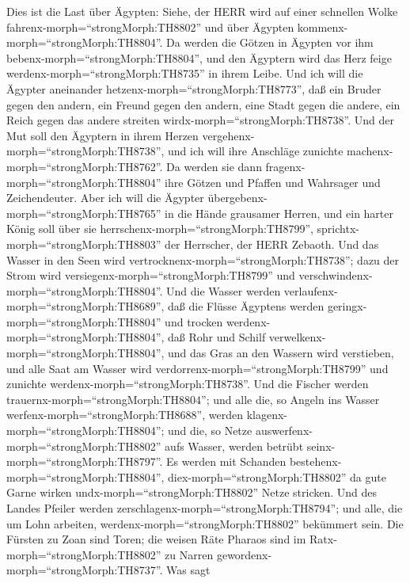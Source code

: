  Dies ist die Last über Ägypten: Siehe, der HERR wird auf
einer schnellen Wolke fahrenx-morph=``strongMorph:TH8802'' und über
Ägypten kommenx-morph=``strongMorph:TH8804''. Da werden die Götzen in
Ägypten vor ihm bebenx-morph=``strongMorph:TH8804'', und den Ägyptern
wird das Herz feige werdenx-morph=``strongMorph:TH8735'' in ihrem Leibe.
 Und ich will die Ägypter aneinander
hetzenx-morph=``strongMorph:TH8773'', daß ein Bruder gegen den andern,
ein Freund gegen den andern, eine Stadt gegen die andere, ein Reich
gegen das andere streiten wirdx-morph=``strongMorph:TH8738''.
 Und der Mut soll den Ägyptern in ihrem Herzen
vergehenx-morph=``strongMorph:TH8738'', und ich will ihre Anschläge
zunichte machenx-morph=``strongMorph:TH8762''. Da werden sie dann
fragenx-morph=``strongMorph:TH8804'' ihre Götzen und Pfaffen und
Wahrsager und Zeichendeuter.  Aber ich will die Ägypter
übergebenx-morph=``strongMorph:TH8765'' in die Hände grausamer Herren,
und ein harter König soll über sie
herrschenx-morph=``strongMorph:TH8799'',
sprichtx-morph=``strongMorph:TH8803'' der Herrscher, der HERR Zebaoth.
 Und das Wasser in den Seen wird
vertrocknenx-morph=``strongMorph:TH8738''; dazu der Strom wird
versiegenx-morph=``strongMorph:TH8799'' und
verschwindenx-morph=``strongMorph:TH8804''.  Und die Wasser
werden verlaufenx-morph=``strongMorph:TH8689'', daß die Flüsse Ägyptens
werden geringx-morph=``strongMorph:TH8804'' und trocken
werdenx-morph=``strongMorph:TH8804'', daß Rohr und Schilf
verwelkenx-morph=``strongMorph:TH8804'',  und das Gras an
den Wassern wird verstieben, und alle Saat am Wasser wird
verdorrenx-morph=``strongMorph:TH8799'' und zunichte
werdenx-morph=``strongMorph:TH8738''.  Und die Fischer
werden trauernx-morph=``strongMorph:TH8804''; und alle die, so Angeln
ins Wasser werfenx-morph=``strongMorph:TH8688'', werden
klagenx-morph=``strongMorph:TH8804''; und die, so Netze
auswerfenx-morph=``strongMorph:TH8802'' aufs Wasser, werden betrübt
seinx-morph=``strongMorph:TH8797''.  Es werden mit Schanden
bestehenx-morph=``strongMorph:TH8804'',
diex-morph=``strongMorph:TH8802'' da gute Garne wirken
undx-morph=``strongMorph:TH8802'' Netze stricken.  Und des
Landes Pfeiler werden zerschlagenx-morph=``strongMorph:TH8794''; und
alle, die um Lohn arbeiten, werdenx-morph=``strongMorph:TH8802''
bekümmert sein.  Die Fürsten zu Zoan sind Toren; die weisen
Räte Pharaos sind im Ratx-morph=``strongMorph:TH8802'' zu Narren
gewordenx-morph=``strongMorph:TH8737''. Was sagt
